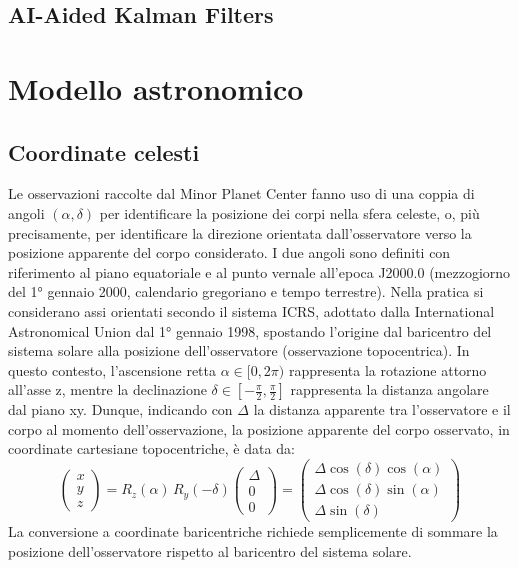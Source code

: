 \documentclass[12pt,a4paper,openright,twoside]{book}
\begin{document}

\section{AI-Aided Kalman Filters}


\chapter{Modello astronomico}

\section{Coordinate celesti}

Le osservazioni raccolte dal Minor Planet Center fanno uso di una coppia di angoli $(\alpha,\delta)$ per identificare la posizione dei corpi nella sfera celeste, o, più precisamente, per identificare la direzione orientata dall'osservatore verso la posizione apparente del corpo considerato. I due angoli sono definiti con riferimento al piano equatoriale e al punto vernale all'epoca J2000.0 (mezzogiorno del 1° gennaio 2000, calendario gregoriano e tempo terrestre). Nella pratica si considerano assi orientati secondo il sistema ICRS, adottato dalla International Astronomical Union dal 1° gennaio 1998, spostando l'origine dal baricentro del sistema solare alla posizione dell'osservatore (osservazione topocentrica). In questo contesto, l'ascensione retta $\alpha\in[0,2\pi)$ rappresenta la rotazione attorno all'asse z, mentre la declinazione $\delta\in\left[-\frac{\pi}{2},\frac{\pi}{2}\right]$ rappresenta la distanza angolare dal piano xy. Dunque, indicando con $\Delta$ la distanza apparente tra l'osservatore e il corpo al momento dell'osservazione, la posizione apparente del corpo osservato, in coordinate cartesiane topocentriche, è data da:
\begin{equation}
\begin{pmatrix} x \\ y \\ z \end{pmatrix}=R_z(\alpha)\,R_y(-\delta)\begin{pmatrix} \Delta \\ 0 \\ 0 \end{pmatrix}=\begin{pmatrix} \Delta\cos(\delta)\cos(\alpha) \\ \Delta\cos(\delta)\sin(\alpha) \\ \Delta\sin(\delta) \end{pmatrix}
\end{equation}
La conversione a coordinate baricentriche richiede semplicemente di sommare la posizione dell'osservatore rispetto al baricentro del sistema solare.
\pagebreak
\end{document}
